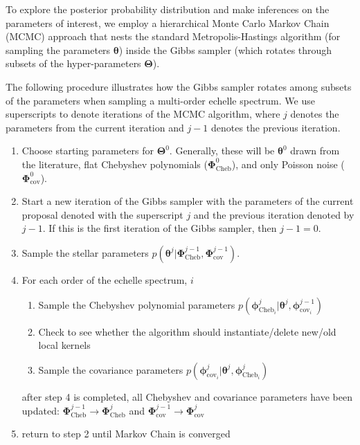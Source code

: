 \documentclass[iop,floatfix]{emulateapj}
\newcommand{\vt}{ {\bm \theta}}
\newcommand{\vT}{ {\bm \Theta}}
\newcommand{\vt}{ {\bm \theta}}
\newcommand{\vT}{ {\bm \Theta}}
\newcommand{\vp}{ {\bm \phi}}
\newcommand{\vP}{ {\bm \Phi}}
\newcommand{\stellarParameters}{\vt}
\newcommand{\chebi}[1]{ \vp_{\textrm{Cheb}_{#1}}} %
\newcommand{\Cheb}{ \vP_{\textrm{Cheb}}}
\newcommand{\covi}[1]{ \vp_{\textrm{cov}_{#1}}} %
\newcommand{\Cov}{ \vP_{\textrm{cov}}}
\newcommand{\allParameters}{\vT} %
\begin{document}
To explore the posterior probability distribution and make inferences on the parameters of 
interest, we employ a hierarchical Monte Carlo Markov Chain (MCMC) approach that nests the standard 
Metropolis-Hastings algorithm (for sampling the parameters $\vt$) inside the Gibbs sampler (which 
rotates through subsets of the hyper-parameters $\vT$).  

The following procedure illustrates how the Gibbs sampler rotates among subsets of the parameters when sampling a multi-order echelle spectrum. We use superscripts to denote iterations of the MCMC algorithm, where $j$ denotes the parameters from the current iteration and $j - 1$ denotes the previous iteration.

\begin{enumerate}
  \item Choose starting parameters for $\allParameters^0$. Generally, these will be $\stellarParameters^0$ drawn from the literature, flat Chebyshev polynomials ($\Cheb^0$), and only Poisson noise ($\Cov^0$). 
  \item Start a new iteration of the Gibbs sampler with the parameters of the current proposal denoted with the superscript $j$ and the previous iteration denoted by $j-1$. If this is the first iteration of the Gibbs sampler, then $j - 1 = 0$.
  \item Sample the stellar parameters $p(\stellarParameters^j | \Cheb^{j-1}, \Cov^{j-1})$. 
  \item For each order of the echelle spectrum, $i$
    \begin{enumerate}
      \item Sample the Chebyshev polynomial parameters $p(\chebi{i}^j | \stellarParameters^j, \covi{i}^{j-1} )$
      \item Check to see whether the algorithm should instantiate/delete new/old local kernels
      \item Sample the covariance parameters $p(\covi{i}^j | \stellarParameters^j, \chebi{i}^{j})$ 
    \end{enumerate}
  after step 4 is completed, all Chebyshev and covariance parameters have been updated: $\Cheb^{j-1} \rightarrow \Cheb^j$ and $\Cov^{j-1} \rightarrow \Cov^j$
    \item return to step 2 until Markov Chain is converged
\end{enumerate}
\end{document}
